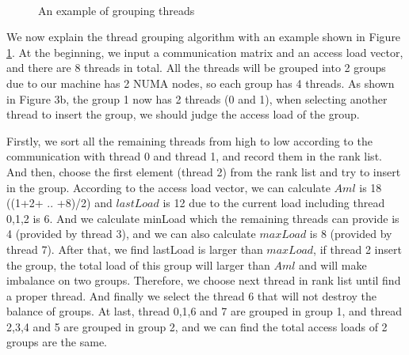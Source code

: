 \documentclass[a4paper,fleqn]{cas-sc}
\begin{document}
\begin{figure}[htbp]
{\begin{minipage}[t]{0.45\linewidth}
		\end{minipage}%
	}%
	\, %
	\centering
	\caption{An example of grouping threads} \label{FIG:3}
\end{figure}

We now explain the thread grouping algorithm with an example shown in Figure \ref{FIG:3}. At the beginning, we input a communication matrix and an access load vector, and there are 8 threads in total. All the threads will be grouped into 2 groups due to our machine has 2 NUMA nodes, so each group has 4 threads. As shown in Figure 3b, the group 1 now has 2 threads (0 and 1), when selecting another thread to insert the group, we should judge the access load of the group.

Firstly, we sort all the remaining threads from high to low according to the communication with thread 0 and thread 1, and record them in the rank list. And then, choose the first element (thread 2) from the rank list and try to insert in the group. According to the access load vector, we can calculate $Aml$ is 18 ((1+2+ .. +8)/2) and $lastLoad$ is 12 due to the current load including thread 0,1,2 is 6. And we calculate minLoad which the remaining threads can provide is 4 (provided by thread 3), and we can also calculate $maxLoad$ is 8 (provided by thread 7). After that, we find lastLoad is larger than $maxLoad$, if thread 2 insert the group, the total load of this group will larger than $Aml$ and will make imbalance on two groups. Therefore, we choose next thread in rank list until find a proper thread. And finally we select the thread 6 that will not destroy the balance of groups. At last, thread 0,1,6 and 7 are grouped in group 1, and thread 2,3,4 and 5 are grouped in group 2, and we can find the total access loads of 2 groups are the same. 
\end{document}
